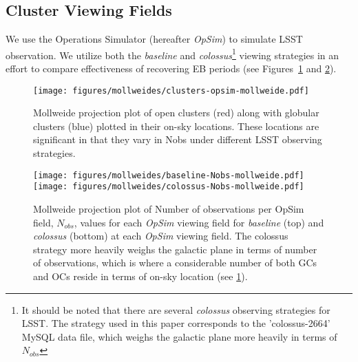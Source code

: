 \documentclass[twocolumn]{aastex63}
\begin{document}
\subsection{Cluster Viewing Fields} \label{sec:overlap}
We use the Operations Simulator (hereafter \textit{OpSim}) to simulate LSST observation. We utilize both the \textit{baseline} and \textit{colossus}\footnote{It should be noted that there are several \textit{colossus} observing strategies for LSST. The strategy used in this paper corresponds to the 'colossus-2664' MySQL data file, which weighs the galactic plane more heavily in terms of $N_{obs}$} viewing strategies in an effort to compare effectiveness of recovering EB periods (see Figures~\ref{fig:cluster_mollweide} and \ref{fig:baseline_mollweide}). 

\begin{figure}
    \centering
    \texttt{[image: figures/mollweides/clusters-opsim-mollweide.pdf]}
    \caption{Mollweide projection plot of open clusters (red) along with globular clusters (blue) plotted in their on-sky locations. These locations are significant in that they vary in Nobs under different LSST observing strategies.}
    \label{fig:cluster_mollweide}
\end{figure}

\begin{figure}
    \centering
        \texttt{[image: figures/mollweides/baseline-Nobs-mollweide.pdf]}
        \texttt{[image: figures/mollweides/colossus-Nobs-mollweide.pdf]}
        
        \caption{Mollweide projection plot of Number of observations per OpSim field, $N_{obs}$, values for each \textit{OpSim} viewing field for \textit{baseline} (top) and \textit{colossus} (bottom) at each \textit{OpSim} viewing field. The colossus strategy more heavily weighs the galactic plane in terms of number of observations, which is where a considerable number of both GCs and OCs reside in terms of on-sky location (see \ref{fig:cluster_mollweide}).}
        \label{fig:colossus_mollweide}
        \label{fig:baseline_mollweide}

\end{figure}
\end{document}
